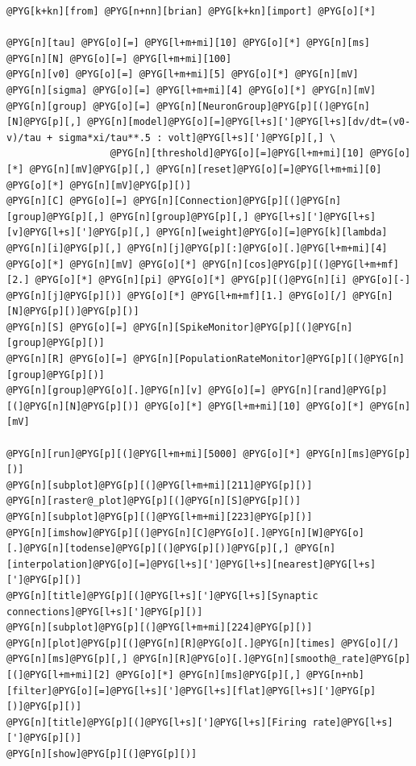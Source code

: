\documentclass[letterpaper,10pt,english]{manual}
\begin{document}
\begin{Verbatim}[commandchars=@\[\]]
@PYG[k+kn][from] @PYG[n+nn][brian] @PYG[k+kn][import] @PYG[o][*]

@PYG[n][tau] @PYG[o][=] @PYG[l+m+mi][10] @PYG[o][*] @PYG[n][ms]
@PYG[n][N] @PYG[o][=] @PYG[l+m+mi][100]
@PYG[n][v0] @PYG[o][=] @PYG[l+m+mi][5] @PYG[o][*] @PYG[n][mV]
@PYG[n][sigma] @PYG[o][=] @PYG[l+m+mi][4] @PYG[o][*] @PYG[n][mV]
@PYG[n][group] @PYG[o][=] @PYG[n][NeuronGroup]@PYG[p][(]@PYG[n][N]@PYG[p][,] @PYG[n][model]@PYG[o][=]@PYG[l+s][']@PYG[l+s][dv/dt=(v0-v)/tau + sigma*xi/tau**.5 : volt]@PYG[l+s][']@PYG[p][,] \
                  @PYG[n][threshold]@PYG[o][=]@PYG[l+m+mi][10] @PYG[o][*] @PYG[n][mV]@PYG[p][,] @PYG[n][reset]@PYG[o][=]@PYG[l+m+mi][0] @PYG[o][*] @PYG[n][mV]@PYG[p][)]
@PYG[n][C] @PYG[o][=] @PYG[n][Connection]@PYG[p][(]@PYG[n][group]@PYG[p][,] @PYG[n][group]@PYG[p][,] @PYG[l+s][']@PYG[l+s][v]@PYG[l+s][']@PYG[p][,] @PYG[n][weight]@PYG[o][=]@PYG[k][lambda] @PYG[n][i]@PYG[p][,] @PYG[n][j]@PYG[p][:]@PYG[o][.]@PYG[l+m+mi][4] @PYG[o][*] @PYG[n][mV] @PYG[o][*] @PYG[n][cos]@PYG[p][(]@PYG[l+m+mf][2.] @PYG[o][*] @PYG[n][pi] @PYG[o][*] @PYG[p][(]@PYG[n][i] @PYG[o][-] @PYG[n][j]@PYG[p][)] @PYG[o][*] @PYG[l+m+mf][1.] @PYG[o][/] @PYG[n][N]@PYG[p][)]@PYG[p][)]
@PYG[n][S] @PYG[o][=] @PYG[n][SpikeMonitor]@PYG[p][(]@PYG[n][group]@PYG[p][)]
@PYG[n][R] @PYG[o][=] @PYG[n][PopulationRateMonitor]@PYG[p][(]@PYG[n][group]@PYG[p][)]
@PYG[n][group]@PYG[o][.]@PYG[n][v] @PYG[o][=] @PYG[n][rand]@PYG[p][(]@PYG[n][N]@PYG[p][)] @PYG[o][*] @PYG[l+m+mi][10] @PYG[o][*] @PYG[n][mV]

@PYG[n][run]@PYG[p][(]@PYG[l+m+mi][5000] @PYG[o][*] @PYG[n][ms]@PYG[p][)]
@PYG[n][subplot]@PYG[p][(]@PYG[l+m+mi][211]@PYG[p][)]
@PYG[n][raster@_plot]@PYG[p][(]@PYG[n][S]@PYG[p][)]
@PYG[n][subplot]@PYG[p][(]@PYG[l+m+mi][223]@PYG[p][)]
@PYG[n][imshow]@PYG[p][(]@PYG[n][C]@PYG[o][.]@PYG[n][W]@PYG[o][.]@PYG[n][todense]@PYG[p][(]@PYG[p][)]@PYG[p][,] @PYG[n][interpolation]@PYG[o][=]@PYG[l+s][']@PYG[l+s][nearest]@PYG[l+s][']@PYG[p][)]
@PYG[n][title]@PYG[p][(]@PYG[l+s][']@PYG[l+s][Synaptic connections]@PYG[l+s][']@PYG[p][)]
@PYG[n][subplot]@PYG[p][(]@PYG[l+m+mi][224]@PYG[p][)]
@PYG[n][plot]@PYG[p][(]@PYG[n][R]@PYG[o][.]@PYG[n][times] @PYG[o][/] @PYG[n][ms]@PYG[p][,] @PYG[n][R]@PYG[o][.]@PYG[n][smooth@_rate]@PYG[p][(]@PYG[l+m+mi][2] @PYG[o][*] @PYG[n][ms]@PYG[p][,] @PYG[n+nb][filter]@PYG[o][=]@PYG[l+s][']@PYG[l+s][flat]@PYG[l+s][']@PYG[p][)]@PYG[p][)]
@PYG[n][title]@PYG[p][(]@PYG[l+s][']@PYG[l+s][Firing rate]@PYG[l+s][']@PYG[p][)]
@PYG[n][show]@PYG[p][(]@PYG[p][)]
\end{Verbatim}
\end{document}
